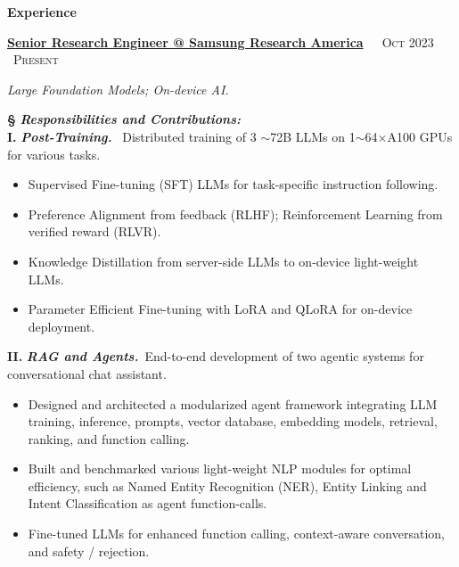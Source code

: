 \documentclass{resume} %
\begin{document}
 

\vspace{-3mm}
\begin{rSection}{\Large \textbf{Experience}}

{\bf \large{{\underline {Senior Research Engineer @ Samsung Research America}}}}\ \ \       \textsc{\hfill Oct 2023  \textendash\  Present}
\vspace{-2mm}

\large{\textsl{Large Foundation Models; On-device AI.}} 
\vspace{-1mm}

\textbf{\S} \textsl{\textbf{Responsibilities and Contributions:}}\\
\textbf{I.} \textsl{\bf  Post-Training.} \, Distributed training of 3 $\sim$72B LLMs on 1$\sim$64$\times$A100 GPUs for various tasks. 
\vspace{-1mm}
\begin{itemize}[noitemsep, topsep=-1pt, parsep=1pt, partopsep=1pt]
    \item Supervised Fine-tuning (SFT) LLMs for task-specific instruction following.
    \item Preference Alignment from feedback (RLHF); Reinforcement Learning from verified reward (RLVR).
    \item Knowledge Distillation from server-side LLMs to on-device light-weight LLMs. 
    \item Parameter Efficient Fine-tuning with LoRA and QLoRA for on-device deployment.
\end{itemize}

\vspace{-1mm}
\textbf{II.} \textsl{\bf RAG and Agents.} \,End-to-end development of two agentic systems for conversational chat assistant.
\vspace{-1mm}
\begin{itemize}[noitemsep, topsep=-1pt, parsep=1pt, partopsep=1pt]
    \item Designed and architected a modularized agent framework integrating LLM training, inference, prompts, vector database, embedding models, retrieval, ranking, and function calling.
    \item Built and benchmarked various light-weight NLP modules for optimal efficiency, such as Named Entity Recognition (NER), Entity Linking and Intent Classification as agent function-calls.
    \item Fine-tuned LLMs for enhanced function calling, context-aware conversation, and safety / rejection.
\end{itemize}


\end{rSection}
\end{document}
